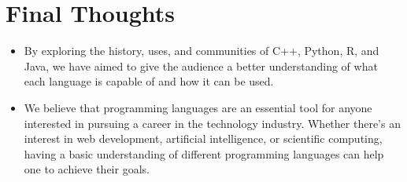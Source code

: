 \section{Final Thoughts}
\begin{itemize}
	\item By exploring the history, uses, and communities of C++, Python, R, and Java, we have aimed to give the audience a better understanding of what each language is capable of and how it can be used.
	
	\item We believe that programming languages are an essential tool for anyone interested in pursuing a career in the technology industry. Whether there's an interest in web development, artificial intelligence, or scientific computing, having a basic understanding of different programming languages can help one to achieve their goals.

\end{itemize}